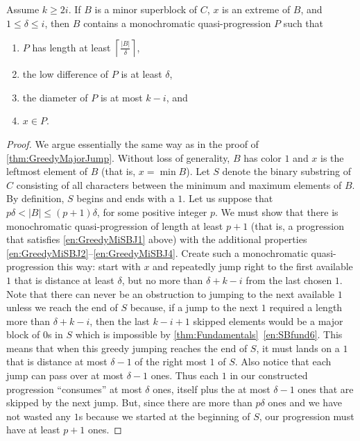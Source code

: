 \begin{theorem}\label{thm:GreedyMinorJump} 
Assume $k \geq 2i$.
If $B$ is a minor superblock of $C$, $x$ is an extreme of $B$, and $1 \leq \delta \leq i$, then $B$ contains a monochromatic quasi-progression $P$ such that 
\begin{enumerate}
   \item\label{en:GreedyMiSBJ1} $P$ has length at least $\left\lceil \frac{|B|}{\delta} \right\rceil$,
   \item\label{en:GreedyMiSBJ2} the low difference of $P$ is at least $\delta$,
   \item\label{en:GreedyMiSBJ3} the diameter of $P$ is at most $k-i$, and
   \item\label{en:GreedyMiSBJ4} $x \in P$.
\end{enumerate}
\end{theorem}
\begin{proof} We argue essentially the same way as in the proof of \autoref{thm:GreedyMajorJump}. Without loss of generality, $B$ has color $1$ and $x$ is the leftmost element of $B$ (that is, $x = \min B$). Let $S$ denote the binary substring of $C$ consisting of all characters between the minimum and maximum elements of $B$. By definition, $S$ begins and ends with a $1$. Let us suppose that $p \delta < |B| \leq (p+1)\delta$, for some positive integer $p$. We must show that there is monochromatic quasi-progression of length at least $p+1$ (that is, a progression that satisfies \ref{en:GreedyMiSBJ1} above) with the additional properties \ref{en:GreedyMiSBJ2}--\ref{en:GreedyMiSBJ4}. Create such a monochromatic quasi-progression this way: start with $x$ and repeatedly jump right to the first available $1$ that is distance at least $\delta$, but no more than $\delta + k-i$ from the last chosen $1$. Note that there can never be an obstruction to jumping to the next available $1$ unless we reach the end of $S$ because, if a jump to the next $1$ required a length more than $\delta + k-i$, then the last $k-i+1$ skipped elements would be a major block of $0$s in $S$ which is impossible by \autoref{thm:Fundamentals}~\ref{en:SBfund6}. This means that when this greedy jumping reaches the end of $S$, it must lands on a $1$ that is distance at most $\delta - 1$ of the right most $1$ of $S$. Also notice that each jump can pass over at most $\delta - 1$ ones. Thus each $1$ in our constructed progression ``consumes'' at most $\delta$ ones, itself plus the at most $\delta-1$ ones that are skipped by the next jump. But, since there are more than $p \delta$ ones and we have not wasted any $1$s because we started at the beginning of $S$, our progression must have at least $p + 1$ ones.
\end{proof}

